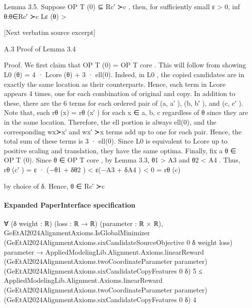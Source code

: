 \documentclass[10pt]{article}
\begin{document}
\begin{ReviewVerbatim}
Lemma 3.5. Suppose OP T (0) ⊆ Rc′ ≻c , then, for sufficiently small ε > 0, inf θ:θ∈Rc′ ≻c Lε (θ) >

[Next verbatim source excerpt]

A.3   Proof of Lemma 3.4

Proof. We first claim that OP T (0) = OP T core . This will follow from showing
                                      L0 (θ) = 4 · Lcore (θ) + 3 · ell(0).
Indeed, in L0 , the copied candidates are in exactly the same location as their counterparts. Hence,
each term in Lcore appears 4 times, one for each combination of original and copy. In addition
to these, there are the 6 terms for each ordered pair of (a, a′ ), (b, b′ ), and (c, c′ ). Note that, each
rθ (x) = rθ (x′ ) for each x ∈ {a, b, c} regardless of θ since they are in the same location. Therefore,
the ell portion is always ell(0), and the corresponding wx≻x′ and wx′ ≻x terms add up to one for each
pair. Hence, the total sum of these terms is 3 · ell(0). Since L0 is equivalent to Lcore up to positive
scaling and translation, they have the same optima.
Finally, fix a θ ∈ OP T (0). Since θ ∈ OP T core , by Lemma 3.3, θ1 > A3 and θ2 < A4 . Thus,
                      rθ (c′ ) = ε · (−θ1 + δθ2 ) < ε(−A3 + δA4 ) < 0 = rθ (c)

by choice of δ. Hence, θ ∈ Rc′ ≻c
\end{ReviewVerbatim}



\paragraph{Expanded PaperInterface specification}
\begin{ReviewVerbatim}
∀ (δ weight : ℝ) (loss : ℝ → ℝ) (parameter : ℝ × ℝ),
  GeEtAl2024AlignmentAxioms.IsGlobalMinimizer (GeEtAl2024AlignmentAxioms.sixCandidateSourceObjective 0 δ weight loss)
      parameter →
    AppliedModelingLib.Alignment.Axioms.linearReward (GeEtAl2024AlignmentAxioms.twoCoordinateParameter parameter)
        (GeEtAl2024AlignmentAxioms.sixCandidateCopyFeatures 0 δ) 5 ≤
      AppliedModelingLib.Alignment.Axioms.linearReward (GeEtAl2024AlignmentAxioms.twoCoordinateParameter parameter)
        (GeEtAl2024AlignmentAxioms.sixCandidateCopyFeatures 0 δ) 4
\end{ReviewVerbatim}
\end{document}
